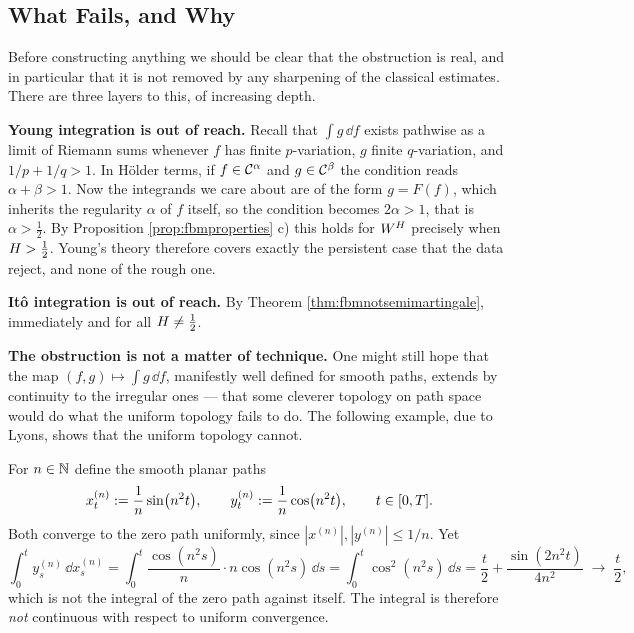 \subsection{What Fails, and Why}\label{subsec:whatfails}

Before constructing anything we should be clear that the obstruction is real, and in particular
that it is not removed by any sharpening of the classical estimates. There are three layers to
this, of increasing depth.

\medskip

\noindent\textbf{Young integration is out of reach.} Recall
that $\int g\,\dd f$ exists pathwise as a limit of Riemann sums whenever $f$ has finite
$p$-variation, $g$ finite $q$-variation, and $1/p + 1/q > 1$. In Hölder terms, if
$f \in \mathcal{C}^{\alpha}$ and $g \in \mathcal{C}^{\beta}$ the condition reads $\alpha + \beta > 1$. Now the
integrands we care about are of the form $g = F(f)$, which inherits the regularity $\alpha$ of $f$
itself, so the condition becomes $2\alpha > 1$, that is $\alpha > \tfrac12$. By Proposition
\ref{prop:fbmproperties} c) this holds for $W^{H}$ precisely when $H > \tfrac12$. Young's theory
therefore covers exactly the persistent case that the data reject, and none of the rough one.

\medskip

\noindent\textbf{Itô integration is out of reach.} By Theorem \ref{thm:fbmnotsemimartingale},
immediately and for all $H \neq \tfrac12$.

\medskip

\noindent\textbf{The obstruction is not a matter of technique.} One might still hope that the
map $(f,g)\mapsto \int g\,\dd f$, manifestly well defined for smooth paths, extends by continuity
to the irregular ones --- that some cleverer topology on path space would do what the uniform
topology fails to do. The following example, due to Lyons, shows that the uniform topology cannot.

\begin{example}\label{ex:lyonscounterexample}
For $n \in \mathbb{N}$ define the smooth planar paths
\begin{equation}\label{eq:lyonsexample}
x^{(n)}_t := \frac{1}{n}\sin\bigl(n^2 t\bigr), \qquad
y^{(n)}_t := \frac{1}{n}\cos\bigl(n^2 t\bigr), \qquad t \in [0,T].
\end{equation}
Both converge to the zero path uniformly, since $|x^{(n)}|,|y^{(n)}| \leq 1/n$. Yet
\[
\int_0^t y^{(n)}_s\,\dd x^{(n)}_s = \int_0^t \frac{\cos(n^2s)}{n}\cdot n\cos(n^2 s)\,\dd s
= \int_0^t \cos^2(n^2 s)\,\dd s = \frac{t}{2} + \frac{\sin(2n^2t)}{4n^2} \;\longrightarrow\; \frac{t}{2},
\]
which is not the integral of the zero path against itself. The integral is therefore \emph{not}
continuous with respect to uniform convergence.
\end{example}

